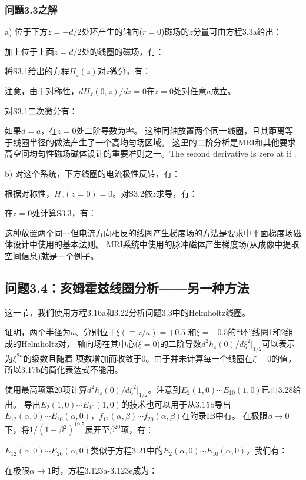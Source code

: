 \subsubsection{问题3.3之解}
a) 位于下方$z=−d/2$处环产生的轴向($r =0$)磁场的$z$分量可由方程3.3a给出：

加上位于上面$z=d/2$处的线圈的磁场，有：

将S3.1给出的方程$H_z(z)$对$z$微分，有：

注意，由于对称性，$dH_z(0,z)/dz=0$在$z=0$处对任意$a$成立。

对S3.1二次微分有：

如果$d = a$，在$z = 0$处二阶导数为零。
这种同轴放置两个同一线圈，且其距离等于线圈半径的做法产生了一个高均匀场区域。
这里的二阶分析是MRI和其他要求高空间均匀性磁场磁体设计的重要准则之一。The second derivative is zero at  if . 

b) 对这个系统，下方线圈的电流极性反转，有：

根据对称性，$H_z(z=0)=0$。对S3.2依$z$求导，有：

在$z=0$处计算S3.3，有：

这种放置两个同一但电流方向相反的线圈产生梯度场的方法是要求中平面梯度场磁体设计中使用的基本法则。
MRI系统中使用的脉冲磁体产生梯度场(从成像中提取空间信息)就是一个例子。
\newpage

\subsection{问题3.4：亥姆霍兹线圈分析——另一种方法}
这一节，我们使用方程3.16a和3.22分析问题3.3中的Helmholtz线圈。

证明，两个半径为$a$、分别位于$\xi(\equiv z/a)=+0.5$ 和$\xi=−0.5$的“环”线圈1和2组成的Helmholtz对，
轴向场在其中心($\xi=0$)的二阶导数$d^2 h_z(0)/d\xi^2|_{1/2}$可以表示为$\xi^{2n}$的级数且随着
项数增加而收敛于0。由于并未计算每一个线圈在$\xi=0$的值，所以3.17b的简化表达式不能用。


使用最高项第20项计算$d^2 h_z(0)/d\xi^2|_{1/2}$。注意到$E_2(1, 0)\cdots E_{10}(1, 0)$已由3.28给出。
导出$E_2(1, 0)\cdots E_{10}(1, 0)$的技术也可以用于从3.15b导出$E_{12}(\alpha, 0)\cdots E_{20}(\alpha, 0)$，$f_{12}(\alpha,\beta)\cdots f_{20}(\alpha,\beta)$在附录IB中有。
在极限$\beta\rightarrow 0$下，将$1/(1+\beta^2)^{19.5}$展开至$\beta^{20}$项，有：

$E_{12}(\alpha, 0)\cdots E_{20}(\alpha, 0)$类似于方程3.21中的$E_{2}(\alpha, 0)\cdots E_{10}(\alpha, 0)$，我们有：


在极限$\alpha\rightarrow 1$时，方程3.123a-3.123e成为：

